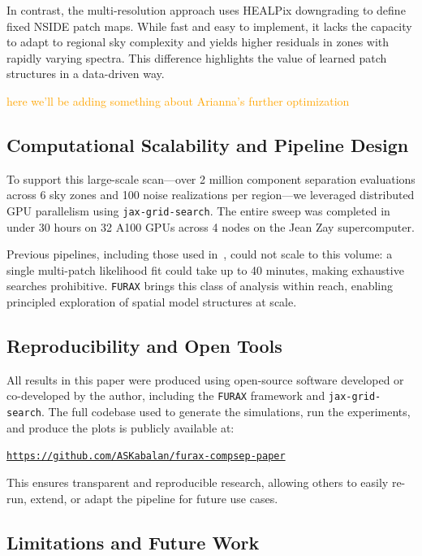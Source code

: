 \documentclass[fleqn,usenatbib]{mnras}
\newcommand{\je}[1]{\textcolor{orange}{#1}}
\begin{document}
In contrast, the multi-resolution approach uses HEALPix downgrading to define fixed NSIDE patch maps. While fast and easy to implement, it lacks the capacity to adapt to regional sky complexity and yields higher residuals in zones with rapidly varying spectra. This difference highlights the value of learned patch structures in a data-driven way.

\je{here we'll be adding something about Arianna's further optimization}

\subsection*{Computational Scalability and Pipeline Design}

To support this large-scale scan---over 2 million component separation evaluations across 6 sky zones and 100 noise realizations per region---we leveraged distributed GPU parallelism using \texttt{jax-grid-search}. The entire sweep was completed in under 30 hours on 32 A100 GPUs across 4 nodes on the Jean Zay supercomputer.

Previous pipelines, including those used in~\cite{LiteBIRD_PTEP_2022}, could not scale to this volume: a single multi-patch likelihood fit could take up to 40 minutes, making exhaustive searches prohibitive. \texttt{FURAX} brings this class of analysis within reach, enabling principled exploration of spatial model structures at scale.

\subsection*{Reproducibility and Open Tools}

All results in this paper were produced using open-source software developed or co-developed by the author, including the \texttt{FURAX} framework and \texttt{jax-grid-search}. The full codebase used to generate the simulations, run the experiments, and produce the plots is publicly available at:

\begin{center}
\texttt{\href{https://github.com/ASKabalan/furax-compsep-paper}{https://github.com/ASKabalan/furax-compsep-paper}}
\end{center}

This ensures transparent and reproducible research, allowing others to easily re-run, extend, or adapt the pipeline for future use cases.

\subsection*{Limitations and Future Work}
\end{document}
